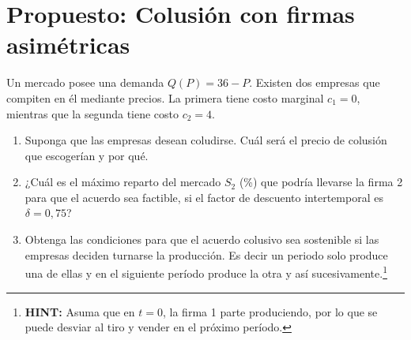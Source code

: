 
\section{Propuesto: Colusión con firmas asimétricas}
Un mercado posee una demanda $Q(P)=36-P$. Existen dos empresas que compiten en él mediante precios. La primera tiene costo marginal $c_{1}=0$, mientras que la segunda tiene costo $c_{2}=4$.

\begin{enumerate}
  \item Suponga que las empresas desean coludirse. Cuál será el precio de colusión que escogerían y por qué.
  \item ¿Cuál es el máximo reparto del mercado $S_{2}$ (\%) que podría llevarse la firma 2 para que el acuerdo sea factible, si el factor de descuento intertemporal es $\delta=0,75$?
  \item Obtenga las condiciones para que el acuerdo colusivo sea sostenible si las empresas deciden turnarse la producción. Es decir un periodo solo produce una de ellas y en el siguiente período produce la otra y así sucesivamente.\footnote{\textbf{HINT:} Asuma que en $t=0$, la firma 1 parte produciendo, por lo que se puede desviar al tiro y vender en el próximo período.}
\end{enumerate}